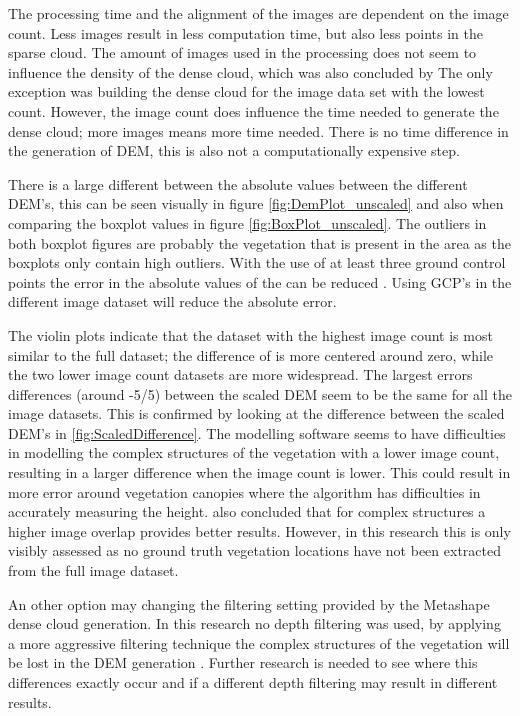 \documentclass{isprs} %
\begin{document}
The processing time and the alignment of the images are dependent on the image count.
Less images result in less computation time, but also less points in the sparse cloud.
The amount of images used in the processing does not seem to influence the density of the dense cloud, which was also concluded by \citet{EffectofUABimgcamover} 
The only exception was building the dense cloud for the image data set with the lowest count. 
However, the image count does influence the time needed to generate the dense cloud; more images means more time needed.
There is no time difference in the generation of DEM, this is also not a computationally expensive step.

There is a large different between the absolute values between the different DEM's, this can be seen visually in figure \ref{fig:DemPlot_unscaled} and also when comparing the boxplot values in figure \ref{fig:BoxPlot_unscaled}.
The outliers in both boxplot figures are probably the vegetation that is present in the area as the boxplots only contain high outliers.
With the use of at least three ground control points the error in the absolute values of the can be reduced \citep{AssessingUAVGCPS, GCPbetterAccuracy, GeoreferencedPointClouds}.
Using GCP's in the different image dataset will reduce the absolute error.

The violin plots indicate that the dataset with the highest image count is most similar to the full dataset; the difference of is more centered around zero, while the two lower image count datasets are more widespread.
The largest errors differences (around -5/5) between the scaled DEM seem to be the same for all the image datasets.
This is confirmed by looking at the difference between the scaled DEM's in \ref{fig:ScaledDifference}.
The modelling software seems to have difficulties in modelling the complex structures of the vegetation with a lower image count, resulting in a larger difference when the image count is lower.
This could result in more error around vegetation canopies where the algorithm has difficulties in accurately measuring the height. 
\citet{AccessingImageOverlap} also concluded that for complex structures a higher image overlap provides better results.
However, in this research this is only visibly assessed as no ground truth vegetation locations have not been extracted from the full image dataset.

An other option may changing the filtering setting provided by the Metashape dense cloud generation.
In this research no depth filtering was used, by applying a more aggressive filtering technique the complex structures of the vegetation will be lost in the DEM generation \citep{AgisoftMetashape}.
Further research is needed to see where this differences exactly occur and if a different depth filtering may result in different results.
\end{document}

